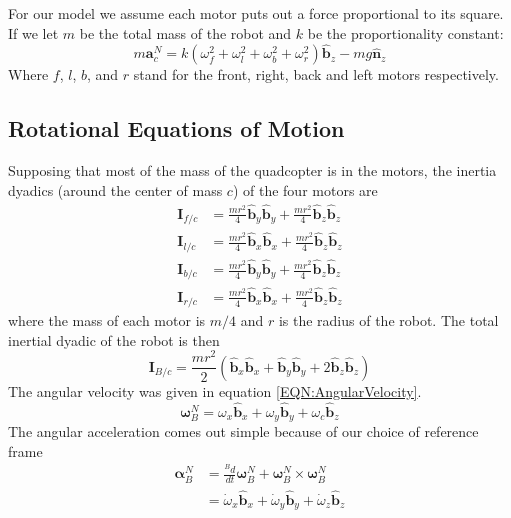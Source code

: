 \documentclass[lettersize,journal]{IEEEtran}
\begin{document}
For our model we assume each motor puts out a force proportional to its square.
If we let $m$ be the total mass of the robot and $k$ be the proportionality constant:
\begin{equation}
  m\mathbf{a}^N_c = k \left(\omega_f^2 + \omega_l^2 + \omega_b^2 + \omega_r^2\right) \mathbf{\hat{b}}_z - mg \mathbf{\hat{n}}_z \label{EQN:LinearEOM}
\end{equation}
Where $f$, $l$, $b$, and $r$ stand for the front, right, back and left motors respectively. 
\subsection{Rotational Equations of Motion}
Supposing that most of the mass of the quadcopter is in the motors, the inertia dyadics (around the center of mass $c$) of the four motors are
\begin{align}
  \mathbf{I}_{f/c} &= \frac{mr^2}{4} \mathbf{\hat{b}}_y\mathbf{\hat{b}}_y + \frac{mr^2}{4} \mathbf{\hat{b}}_z \mathbf{\hat{b}}_z \\
  \mathbf{I}_{l/c} &= \frac{mr^2}{4} \mathbf{\hat{b}}_x\mathbf{\hat{b}}_x + \frac{mr^2}{4} \mathbf{\hat{b}}_z \mathbf{\hat{b}}_z \\
  \mathbf{I}_{b/c} &= \frac{mr^2}{4} \mathbf{\hat{b}}_y\mathbf{\hat{b}}_y + \frac{mr^2}{4} \mathbf{\hat{b}}_z \mathbf{\hat{b}}_z \\
  \mathbf{I}_{r/c} &= \frac{mr^2}{4} \mathbf{\hat{b}}_x\mathbf{\hat{b}}_x + \frac{mr^2}{4} \mathbf{\hat{b}}_z \mathbf{\hat{b}}_z
\end{align}
where the mass of each motor is $m/4$ and $r$ is the radius of the robot.
The total inertial dyadic of the robot is then
\begin{equation}
  \mathbf{I}_{B/c} = \frac{mr^2}{2} \left(\mathbf{\hat{b}}_x\mathbf{\hat{b}}_x + \mathbf{\hat{b}}_y\mathbf{\hat{b}}_y + 2 \mathbf{\hat{b}}_z\mathbf{\hat{b}}_z\right)
\end{equation}
The angular velocity was given in equation \ref{EQN:AngularVelocity}.
\begin{equation}
  {\boldsymbol\omega^N_B} = \omega_x\mathbf{\hat{b}}_x + \omega_y\mathbf{\hat{b}}_y + \omega_c \mathbf{\hat{b}}_z \nonumber
\end{equation}
The angular acceleration comes out simple because of our choice of reference frame
\begin{align}
  \boldsymbol\alpha^N_B &= \frac{^B d}{dt} \boldsymbol\omega^N_B +\boldsymbol\omega_B^N\times\boldsymbol\omega_B^N\nonumber\\
  &= \dot\omega_x \mathbf{\hat{b}}_x + \dot\omega_y \mathbf{\hat{b}}_y + \dot\omega_z \mathbf{\hat{b}}_z
\end{align}
\end{document}

